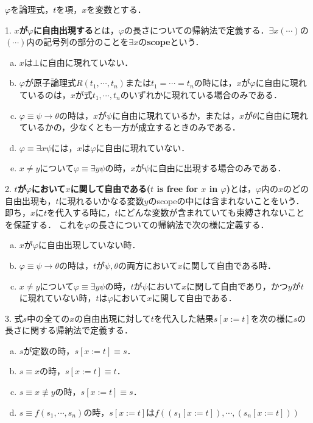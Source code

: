 \documentclass[uplatex, dvipdfmx]{jsreport}
\begin{document}
\begin{definition}
    $\varphi$を論理式，$t$を項，$x$を変数とする．

    1. \textbf{$x$が$\varphi$に自由出現する}とは，$\varphi$の長さについての帰納法で定義する．$\exists x(\cdots)$の$(\cdots)$内の記号列の部分のことを$\exists x$の\textbf{scope}という．
    \begin{enumerate}[(a)]
        \item $x$は$\bot$に自由に現れていない．
        \item $\varphi$が原子論理式$R(t_1,\cdots,t_n)$または$t_1=\cdots=t_n$の時には，$x$が$\varphi$に自由に現れているのは，$x$が式$t_1,\cdots,t_n$のいずれかに現れている場合のみである．
        \item $\varphi\equiv\psi\to\theta$の時は，$x$が$\psi$に自由に現れているか，または，$x$が$\theta$に自由に現れているかの，少なくとも一方が成立するときのみである．
        \item $\varphi\equiv\exists x\psi$には，$x$は$\varphi$に自由に現れていない．
        \item $x\ne y$について$\varphi\equiv\exists y\psi$の時，$x$が$\psi$に自由に出現する場合のみである．
    \end{enumerate}

    2. \textbf{$t$が$\varphi$において$x$に関して自由である($t$ is free for $x$ in $\varphi$)}とは，$\varphi$内の$x$のどの自由出現も，$t$に現れるいかなる変数$y$のscopeの中には含まれないことをいう．即ち，$x$に$t$を代入する時に，$t$にどんな変数が含まれていても束縛されないことを保証する．
    これを$\varphi$の長さについての帰納法で次の様に定義する．
    \begin{enumerate}[(a)]
        \item $x$が$\varphi$に自由出現していない時．
        \item $\varphi\equiv\psi\to\theta$の時は，$t$が$\psi,\theta$の両方において$x$に関して自由である時．
        \item $x\ne y$について$\varphi\equiv\exists y\psi$の時，$t$が$\psi$において$x$に関して自由であり，かつ$y$が$t$に現れていない時，$t$は$\varphi$において$x$に関して自由である．
    \end{enumerate}

    3. 式$s$中の全ての$x$の自由出現に対して$t$を代入した結果$s[x:=t]$を次の様に$s$の長さに関する帰納法で定義する．
    \begin{enumerate}[(a)]
        \item $s$が定数の時，$s[x:=t]\equiv s$．
        \item $s\equiv x$の時，$s[x:=t]\equiv t$．
        \item $s\equiv x\not\equiv y$の時，$s[x:=t]\equiv s$．
        \item $s\equiv f(s_1,\cdots,s_n)$の時，$s[x:=t]$は$f((s_1[x:=t]),\cdots,(s_n[x:=t]))$
    \end{enumerate}


\end{definition}
\end{document}
